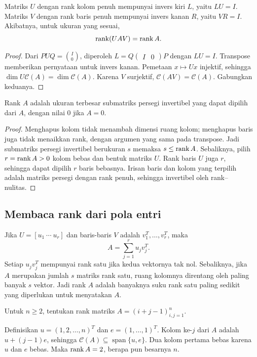 \begin{prop}
    \label{rank:inverse-sisi}
    Matriks $U$ dengan rank kolom penuh mempunyai invers kiri $L$, yaitu
    $LU=I$. Matriks $V$ dengan rank baris penuh mempunyai invers kanan
    $R$, yaitu $VR=I$. Akibatnya, untuk ukuran yang sesuai,
    \[
        \operatorname{rank}(UAV)=\operatorname{rank} A.
    \]
\end{prop}
\begin{proof}
    Dari $PUQ=\binom{I}{0}$, diperoleh
    $L=Q\begin{pmatrix}I&0\end{pmatrix}P$ dengan $LU=I$.
    Transpose memberikan pernyataan untuk invers kanan.
    Pemetaan $x\mapsto Ux$ injektif, sehingga
    $\dim U\mathcal C(A)=\dim\mathcal C(A)$.
    Karena $V$ surjektif, $\mathcal C(AV)=\mathcal C(A)$.
    Gabungkan keduanya.
\end{proof}

\begin{prop}
    Rank $A$ adalah ukuran terbesar submatriks persegi invertibel
    yang dapat dipilih dari $A$, dengan nilai $0$ jika $A=0$.
\end{prop}
\begin{proof}
    Menghapus kolom tidak menambah dimensi ruang kolom; menghapus baris
    juga tidak menaikkan rank, dengan argumen yang sama pada transpose.
    Jadi submatriks persegi invertibel berukuran $s$ memaksa $s\le\operatorname{rank} A$.
    Sebaliknya, pilih $r=\operatorname{rank} A>0$ kolom bebas dan bentuk matriks $U$.
    Rank baris $U$ juga $r$, sehingga dapat dipilih $r$ baris bebasnya.
    Irisan baris dan kolom yang terpilih adalah matriks persegi dengan
    rank penuh, sehingga invertibel oleh rank--nulitas.
\end{proof}

\subsection{Membaca rank dari pola entri}

Jika $U=[u_1\ \cdots\ u_r]$ dan baris-baris $V$ adalah
$v_1^T,\ldots,v_r^T$, maka
\[
    A=\sum_{j=1}^r u_jv_j^T.
\]
Setiap $u_jv_j^T$ mempunyai rank satu jika kedua vektornya tak nol.
Sebaliknya, jika $A$ merupakan jumlah $s$ matriks rank satu, ruang kolomnya
direntang oleh paling banyak $s$ vektor. Jadi rank $A$ adalah banyaknya
suku rank satu paling sedikit yang diperlukan untuk menyatakan $A$.

\begin{exam}
    Untuk $n\ge2$, tentukan rank matriks $A=(i+j-1)_{i,j=1}^n$.
\end{exam}
\begin{solution}
    Definisikan $u=(1,2,\ldots,n)^T$ dan $e=(1,\ldots,1)^T$.
    Kolom ke-$j$ dari $A$ adalah $u+(j-1)e$, sehingga
    $\mathcal C(A)\subseteq\operatorname{span}\{u,e\}$.
    Dua kolom pertama bebas karena $u$ dan $e$ bebas.
    Maka $\operatorname{rank} A=2$, berapa pun besarnya $n$.
\end{solution}

